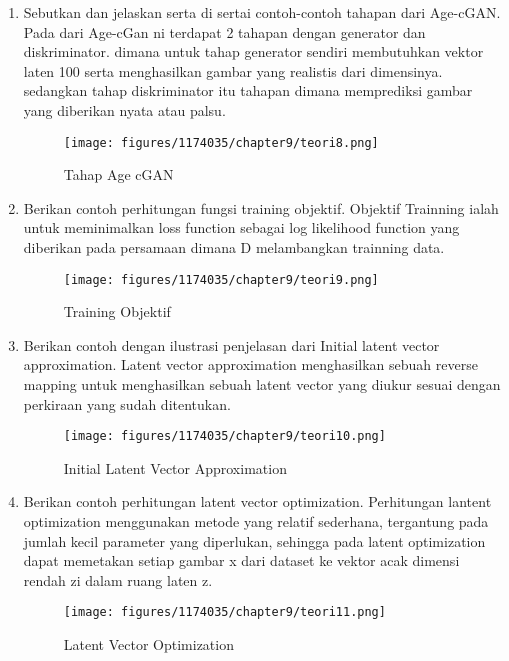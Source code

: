 \begin{enumerate}
        \item Sebutkan dan jelaskan serta di sertai contoh-contoh tahapan dari Age-cGAN.
		Pada dari Age-cGan ni terdapat 2 tahapan dengan generator dan diskriminator. dimana untuk tahap generator sendiri membutuhkan vektor laten 100 serta menghasilkan gambar yang realistis dari dimensinya. sedangkan tahap diskriminator itu tahapan dimana memprediksi gambar yang diberikan nyata atau palsu.
		\begin{figure}[H]
			\texttt{[image: figures/1174035/chapter9/teori8.png]}
            	\centering
           	 \caption{Tahap Age cGAN}
       	\end{figure}

        \item Berikan contoh perhitungan fungsi training objektif.
		Objektif Trainning ialah untuk meminimalkan loss function sebagai log likelihood function yang diberikan pada persamaan dimana D melambangkan trainning data.
		\begin{figure}[H]
			\texttt{[image: figures/1174035/chapter9/teori9.png]}
            	\centering
           	 \caption{Training Objektif}
       	\end{figure}

        \item Berikan contoh dengan ilustrasi penjelasan dari Initial latent vector approximation.
		Latent vector approximation menghasilkan sebuah reverse mapping untuk menghasilkan sebuah latent vector yang diukur sesuai dengan perkiraan yang sudah ditentukan.
		\begin{figure}[H]
			\texttt{[image: figures/1174035/chapter9/teori10.png]}
            	\centering
           	 \caption{Initial Latent Vector Approximation}
       	\end{figure}

        \item Berikan contoh perhitungan latent vector optimization.
		Perhitungan lantent optimization menggunakan metode yang relatif sederhana, tergantung pada jumlah kecil parameter yang diperlukan, sehingga pada latent optimization dapat memetakan setiap gambar x dari dataset ke vektor acak dimensi rendah zi dalam ruang laten z.
		\begin{figure}[H]
			\texttt{[image: figures/1174035/chapter9/teori11.png]}
            	\centering
           	\caption{Latent Vector Optimization}
        \end{figure}
           
    \end{enumerate}

